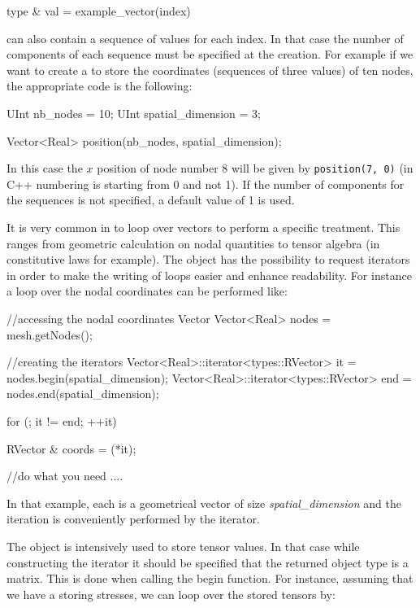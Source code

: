 \begin{cpp}
  type & val = example_vector(index)
\end{cpp}

 can also contain a sequence of values for each
index. In that case the number of components of each sequence must be
specified at the  creation.  For example if we want to
create a  to store the coordinates (sequences of three
values) of ten nodes, the appropriate code is the following:
\begin{cpp}
  UInt nb_nodes = 10;
  UInt spatial_dimension = 3;

  Vector<Real> position(nb_nodes, spatial_dimension);
\end{cpp}
In this case the $x$ position of node number 8 will be given by
\texttt{position(7, 0)} (in C++ numbering is starting from 0 and not
1). If the number of components for the sequences is not specified, a
default value of 1 is used.

It is very common in \akantu to loop over vectors to perform a specific
treatment. This ranges from geometric calculation on nodal quantities
to tensor algebra (in constitutive laws for example).
The  object has the possibility to request iterators
in order to make the writing of loops easier and enhance readability.
For instance a loop over the nodal coordinates can be performed like:
\begin{cpp}
  //accessing the nodal coordinates Vector
  Vector<Real> nodes = mesh.getNodes();

  //creating the iterators
  Vector<Real>::iterator<types::RVector> it  = nodes.begin(spatial_dimension);
  Vector<Real>::iterator<types::RVector> end = nodes.end(spatial_dimension);

  for (; it != end; ++it){
    RVector & coords = (*it);

    //do what you need
    ....

  }
\end{cpp}
In that example, each  is a geometrical vector of size \textit{spatial\_dimension}
and the iteration is conveniently performed by the  iterator.

The  object is intensively used to store tensor values.
In that case while constructing the iterator it should be specified
that the returned object type is a matrix. This is done when calling
the begin function. For instance, assuming that we have a
 storing stresses, we can loop over the stored tensors by:

